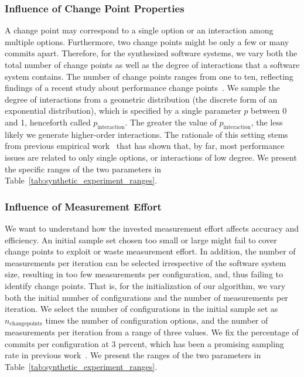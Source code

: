 \documentclass[sigconf, screen]{acmart}
\begin{document}
	\subsubsection{Influence of Change Point Properties}
	A change point may correspond to a single option or an interaction among multiple options. Furthermore, two change points might be only a few or many commits apart. Therefore, for the synthesized software systems, we vary both the total number of change points as well as the degree of interactions that a software system contains. The number of change points ranges from one to ten, reflecting findings of a recent study about performance change points~\cite{muhlbauer_accurate_2019}. We sample the degree of interactions from a geometric distribution (the discrete form of an exponential distribution), which is specified by a single parameter $p$ between 0 and 1, henceforth called $p_\text{interaction}$. The greater the value of $p_\text{interaction}$, the less likely we generate higher-order interactions. The rationale of this setting stems from previous empirical work~\cite{medeiros_comparison_2016,kolesnikov_tradeoffs_2019} that has shown that, by far, most performance issues are related to only single options, or interactions of low degree. We present the specific ranges of the two parameters in Table~\ref{tab:synthetic_experiment_ranges}.
	
	\subsubsection{Influence of Measurement Effort}
	We want to understand how the invested measurement effort affects accuracy and efficiency. An initial sample set chosen too small or large might fail to cover change points to exploit or waste measurement effort. In addition, the number of measurements per iteration can be selected irrespective of the software system size, resulting in too few measurements per configuration, and, thus failing to identify change points. That is, for the initialization of our algorithm, we vary both the initial number of configurations and the number of measurements per iteration. We select the number of configurations in the initial sample set as $n_\text{changepoints}$ times the number of configuration options, and the number of measurements per iteration from a range of three values. We fix the percentage of commits per configuration at 3 percent, which has been a promising sampling rate in previous work~\cite{muhlbauer_accurate_2019}. 
	We present the ranges of the two parameters in Table~\ref{tab:synthetic_experiment_ranges}.
	
\end{document}
